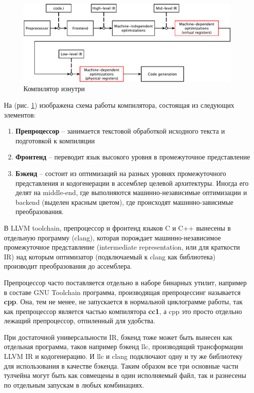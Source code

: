\documentclass[a4paper,12pt,oneside]{article}
\begin{document}
\begin{figure}[ht]
\centering
\includegraphics[width=1.0\textwidth]{illustrations/compiler-crop.pdf}
\caption{Компилятор изнутри}
\label{fig:compiler_scheme}
\end{figure}

На (рис. \ref{fig:compiler_scheme}) изображена схема работы компилятора, состоящая из следующих элементов:

\begin{enumerate}
\item \textbf{Препроцессор} -- занимается текстовой обработкой исходного текста и подготовкой к компиляции
\item \textbf{Фронтенд} -- переводит язык высокого уровня в промежуточное представление
\item \textbf{Бэкенд} -- состоит из оптимизаций на разных уровнях промежуточного представления и кодогенерации в ассемблер целевой архитектуры. Иногда его делят на middle-end, где выполняются машинно-независимые оптимизации и backend (выделен красным цветом), где происходят машинно-зависимые преобразования.
\end{enumerate}

В LLVM toolchain, препроцессор и фронтенд языков C и C++ вынесены в отдельную программу (clang), которая порождает машинно-независимое промежуточное представление (intermediate representation, или для краткости IR) над которым оптимизатор (подключаемый к clang как библиотека) производит преобразования до ассемблера. 

Препроцессор часто поставляется отдельно в наборе бинарных утилит, например в составе GNU Toolchain программа, производящая препроцессинг называется \textbf{cpp}. Она, тем не менее, не запускается в нормальной циклограмме работы, так как препроцессор является частью компилятора \textbf{cc1}, а cpp это просто отдельно лежащий препроцессор, отпиленный для удобства.

При достаточной универсальности IR, бэкенд тоже может быть вынесен как отдельная программа, таков например бэкенд llc, производящий трансформации LLVM IR и кодогенерацию. И llc и clang подключают одну и ту же библиотеку для использования в качестве бэкенда. Таким образом все три основные части тулчейна могут быть как совмещены в один исполняемый файл, так и разнесены по отдельным запускам в любых комбинациях.
\end{document}
